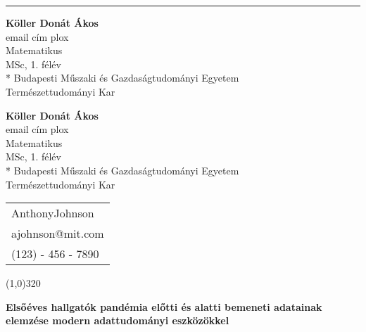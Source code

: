\documentclass[12pt]{article}
\author{Hallgató Hanga}
\begin{document}
\maketitle

\hrule
\vspace{3mm}

\noindent %
\begin{minipage}[c]{\textwidth} %
\begin{flushleft}
\textbf{Köller Donát Ákos} \\
email cím plox \\
Matematikus \\
MSc, 1. félév \\*
Budapesti Műszaki és Gazdaságtudományi Egyetem \\
Természettudományi Kar

\end{flushleft}

\begin{flushright}
\textbf{Köller Donát Ákos} \\
email cím plox \\
Matematikus \\
MSc, 1. félév \\*
Budapesti Műszaki és Gazdaságtudományi Egyetem \\
Természettudományi Kar

\end{flushright}
\end{minipage} %
\hfill
\begin{minipage}[c]{0.35\textwidth}%
\begin{flushright}
\begin{tabular}{ l } 
 AnthonyJohnson \\
 ajohnson@mit.com \\
 (123) - 456 - 7890 \\
\end{tabular}
\end{flushright}
\end{minipage}%


\begin{center}
\line(1,0){320}
\end{center}
\begin{center}
\textbf{Elsőéves hallgatók pandémia előtti és alatti bemeneti
adatainak elemzése modern adattudományi
eszközökkel}
\end{center}
\end{document}
